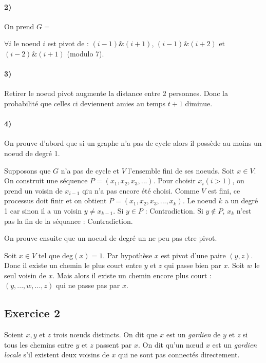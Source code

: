 \paragraph{2)}On prend $G = $
\begin{center}  
\end{center}

$\forall i$ le noeud $i$ est pivot de : 
$(i-1) \& (i+1)$, $(i-1) \& (i+2)$ et $(i-2) \& (i+1)$ 
(modulo 7).
\paragraph{3)} Retirer le noeud pivot augmente la distance entre 2 personnes. Donc la probabilité que celles ci deviennent amies au temps $t+1$ diminue.

\paragraph{4)}On prouve d'abord que si un graphe n'a pas de cycle alors il possède au moins un noeud de degré 1.

Supposons que $G$ n'a pas de cycle et $V$ l'ensemble fini de ses noeuds.
Soit $x \in V$. On construit une séquence $P = (x_1, x_2, x_3, ...)$. Pour choisir $x_i (i>1)$, on prend un voisin de $x_{i-1}$ qiu n'a pas encore été choisi. Comme $V$ est fini, ce processus doit finir et on obtient $P= (x_1, x_2, x_3,...,x_k)$. 
Le noeud $k$ a un degré 1 car sinon il a un voisin $y\neq x_{k-1}$. Si $y \in P$ : Contradiction.
Si $y \notin P$, $x_k$ n'est pas la fin de la séquance : Contradiction.

On prouve ensuite que un noeud de degré un ne peu pas etre pivot.

Soit $x\in V$ tel que deg$(x)=1$.
Par hypothèse $x$ est pivot d'une paire $(y,z)$.
Donc il existe un chemin le plus court entre $y$ et $z$ qui passe bien par $x$.
Soit $w$ le seul voisin de $x$.
Mais alors il existe un chemin encore plus court : $(y, ..., w,...,z)$ qui ne passe pas par $x$.

 
\subsection*{Exercice 2}
Soient $x, y$ et $z$ trois n\oe{}uds distincts. On dit que $x$ est un \emph{gardien} de $y$ et $z$ si tous les chemins entre $y$ et $z$ passent par $x$.
On dit qu'un n\oe{}ud $x$ est un \emph{gardien locale} s'il existent deux voisins de $x$ qui ne sont pas connect\'{e}s directement.
 
